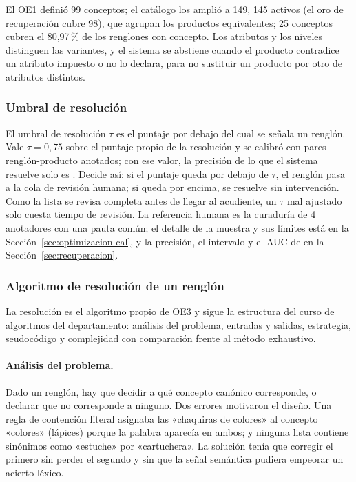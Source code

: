 El OE1 definió 99 conceptos; el catálogo los amplió a 149, 145 activos (el oro de recuperación cubre 98), que agrupan los productos equivalentes; 25 conceptos
cubren el 80,97\,\% de los renglones con concepto. Los atributos y los niveles distinguen las
variantes, y el sistema se abstiene cuando el producto contradice un atributo impuesto o no lo declara,
para no sustituir un producto por otro de atributos distintos.

\subsubsection{Umbral de resolución}

El umbral de resolución $\tau$ es el puntaje por debajo del cual se señala un renglón. Vale $\tau=0{,}75$ sobre el puntaje propio de la resolución y se calibró con \calTauPares{} pares renglón-producto anotados; con ese valor, la precisión de lo que el sistema resuelve solo es \calTauP{}. Decide así: si el puntaje queda por debajo de $\tau$, el renglón pasa a la cola de revisión humana; si queda por encima, se resuelve sin intervención. Como la lista se revisa completa antes de llegar al acudiente, un $\tau$ mal ajustado solo cuesta tiempo de revisión. La referencia humana es la curaduría de 4 anotadores con una pauta común; el detalle de la muestra y sus límites está en la Sección~\ref{sec:optimizacion-cal}, y la precisión, el intervalo y el AUC de \calTauAUC{} en la Sección~\ref{sec:recuperacion}.

\subsubsection{Algoritmo de resolución de un renglón}
\label{sec:algoritmo-resolucion}

La resolución es el algoritmo propio de OE3 y sigue la estructura del curso de algoritmos del
departamento: análisis del problema, entradas y salidas, estrategia, seudocódigo y complejidad con
comparación frente al método exhaustivo.

\paragraph{Análisis del problema.} Dado un renglón, hay que decidir a
qué concepto canónico corresponde, o declarar que no corresponde a ninguno. Dos errores motivaron el
diseño. Una regla de contención literal asignaba las «chaquiras de colores» al concepto «colores»
(lápices) porque la palabra aparecía en ambos; y ninguna lista contiene sinónimos como «estuche» por
«cartuchera». La solución tenía que corregir el primero sin perder el segundo y sin que la señal
semántica pudiera empeorar un acierto léxico.

